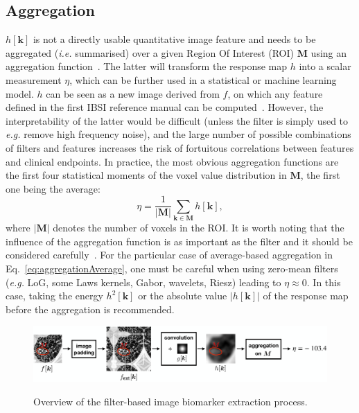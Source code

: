 \documentclass[fleqn,a4paper,oneside,openany]{book}
\begin{document}
\subsection{Aggregation}
%
$h[\boldsymbol{k}]$ is not a directly usable quantitative image feature and needs to be aggregated (\textit{i.e.} summarised) over a given Region Of Interest (ROI) $\boldsymbol{M}$ using an aggregation function~\cite{DFA2017}.
The latter will transform the response map $h$ into a scalar measurement $\eta$, which can be further used in a statistical or machine learning model.
$h$ can be seen as a new image derived from $f$, on which any feature defined in the first IBSI reference manual can be computed~\cite{ZLV2017}.
However, the interpretability of the latter would be difficult (unless the filter is simply used to \textit{e.g.} remove high frequency noise), and the large number of possible combinations of filters and features increases the risk of fortuitous correlations between features and clinical endpoints.
In practice, the most obvious aggregation functions are the first four statistical moments of the voxel value distribution in $\boldsymbol{M}$, the first one being the average:
%
\begin{equation}\label{eq:aggregationAverage}
\eta=
\frac{1}{|\boldsymbol{M}|}
\sum_{\boldsymbol{k}\in \boldsymbol{M}} h[\boldsymbol{k}],
\end{equation}
%
where $|\boldsymbol{M}|$ denotes the number of voxels in the ROI.
%
It is worth noting that the influence of the aggregation function is as important as the filter and it should be considered carefully~\cite{Dep2017}.
For the particular case of average-based aggregation in Eq.~\eqref{eq:aggregationAverage}, one must be careful when using zero-mean filters (\textit{e.g.} LoG, some Laws kernels, Gabor, wavelets, Riesz) leading to $\eta\approx 0$. In this case, taking the energy $h^2[\boldsymbol{k}]$ or the absolute value $|h[\boldsymbol{k}]|$ of the response map before the aggregation is recommended.
%
\begin{figure}
\centering
\includegraphics[trim = 0 0 0 0, clip, width=\linewidth]{overview.png}\\
\caption{Overview of the filter-based image biomarker extraction process.}
  \label{fig:overview}
\end{figure}
%
\end{document}
